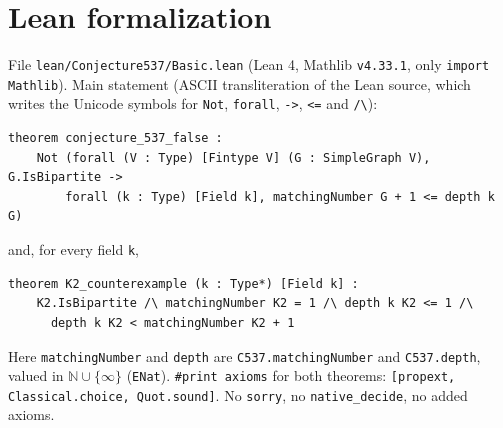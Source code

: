 \documentclass[11pt]{article}
\theoremstyle{definition}
\begin{document}
\section{Lean formalization}

File \texttt{lean/Conjecture537/Basic.lean} (Lean 4, Mathlib \texttt{v4.33.1}, only \texttt{import Mathlib}).
Main statement (ASCII transliteration of the Lean source, which writes the Unicode symbols for
\texttt{Not}, \texttt{forall}, \texttt{->}, \texttt{<=} and \texttt{/\textbackslash}):
\begin{verbatim}
theorem conjecture_537_false :
    Not (forall (V : Type) [Fintype V] (G : SimpleGraph V), G.IsBipartite ->
        forall (k : Type) [Field k], matchingNumber G + 1 <= depth k G)
\end{verbatim}
and, for every field \texttt{k},
\begin{verbatim}
theorem K2_counterexample (k : Type*) [Field k] :
    K2.IsBipartite /\ matchingNumber K2 = 1 /\ depth k K2 <= 1 /\
      depth k K2 < matchingNumber K2 + 1
\end{verbatim}
Here \texttt{matchingNumber} and \texttt{depth} are \texttt{C537.matchingNumber} and \texttt{C537.depth}, valued in
$\mathbb N\cup\{\infty\}$ (\texttt{ENat}).
\texttt{\#print axioms} for both theorems: \texttt{[propext, Classical.choice, Quot.sound]}. No \texttt{sorry}, no
\texttt{native\_decide}, no added axioms.
\end{document}
